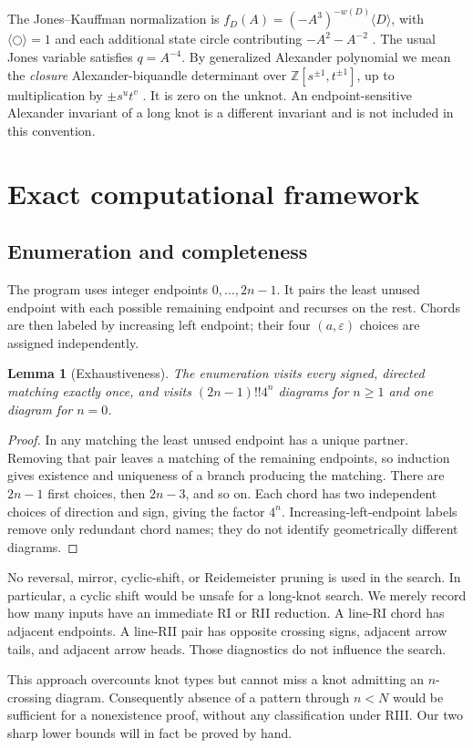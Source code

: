 \documentclass[12pt]{amsart}
\newtheorem{lem}[thm]{Lemma}
\theoremstyle{definition}
\theoremstyle{remark}
\numberwithin{equation}{section}
\newcommand{\Z}{\mathbb{Z}}
\newcommand{\eps}{\varepsilon}
\begin{document}
The Jones--Kauffman normalization is
$f_D(A)=(-A^3)^{-w(D)}\langle D\rangle$, with
$\langle\bigcirc\rangle=1$ and each additional state circle contributing
$-A^2-A^{-2}$ \cite[\S5]{Kauffman}. The usual Jones variable satisfies
$q=A^{-4}$. By generalized Alexander polynomial we mean the
\emph{closure} Alexander-biquandle determinant over
$\Z[s^{\pm1},t^{\pm1}]$, up to multiplication by $\pm s^ut^v$
\cite[\S3]{KR}. It is zero on the unknot. An endpoint-sensitive Alexander
invariant of a long knot is a different invariant and is not included in
this convention.

\section{Exact computational framework}
\subsection{Enumeration and completeness}
The program uses integer endpoints $0,\ldots,2n-1$. It pairs the least
unused endpoint with each possible remaining endpoint and recurses on
the rest. Chords are then labeled by increasing left endpoint; their four
$(a,\eps)$ choices are assigned independently.
\begin{lem}[Exhaustiveness]\label{en:exhaustive}
The enumeration visits every signed, directed matching exactly once, and
visits $(2n-1)!!4^n$ diagrams for $n\ge1$ and one diagram for $n=0$.
\end{lem}
\begin{proof}
In any matching the least unused endpoint has a unique partner. Removing
that pair leaves a matching of the remaining endpoints, so induction gives
existence and uniqueness of a branch producing the matching. There are
$2n-1$ first choices, then $2n-3$, and so on. Each chord has two independent
choices of direction and sign, giving the factor $4^n$.
Increasing-left-endpoint labels remove only redundant chord names; they
do not identify geometrically different diagrams.
\end{proof}
No reversal, mirror, cyclic-shift, or Reidemeister pruning is used in the
search. In particular, a cyclic shift would be unsafe for a long-knot
search. We merely record how many inputs have an immediate RI or RII
reduction. A line-RI chord has adjacent endpoints. A line-RII pair has
opposite crossing signs, adjacent arrow tails, and adjacent arrow heads.
Those diagnostics do not influence the search.

This approach overcounts knot types but cannot miss a knot admitting an
$n$-crossing diagram. Consequently absence of a pattern through $n<N$
would be sufficient for a nonexistence proof, without any classification
under RIII. Our two sharp lower bounds will in fact be proved by hand.
\end{document}
